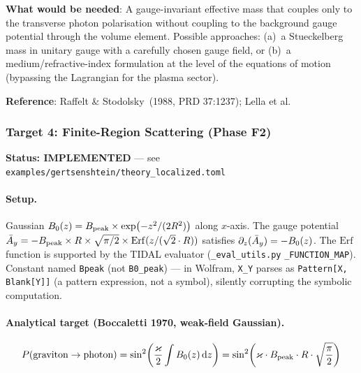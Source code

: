 \textbf{What would be needed}: A gauge-invariant effective mass that couples only to the transverse photon polarisation without coupling to the background gauge potential through the volume element. Possible approaches: (a)~a Stueckelberg mass in unitary gauge with a carefully chosen gauge field, or (b)~a medium/refractive-index formulation at the level of the equations of motion (bypassing the Lagrangian for the plasma sector).

\textbf{Reference}: Raffelt \& Stodolsky~(1988, PRD 37:1237); Lella et al.~\cite{lella2024constraining}

\subsubsection{Target 4: Finite-Region Scattering (Phase F2)}
\label{subsec:target4}

\textbf{Status: IMPLEMENTED} --- see \texttt{examples/gertsenshtein/theory\_localized.toml}

\paragraph{Setup.}
Gaussian $B_0(z) = B_\mathrm{peak} \times \exp(-z^2/(2R^2))$ along $x$-axis. The gauge potential $\bar{A}_y = -B_\mathrm{peak} \times R \times \sqrt{\pi/2} \times \mathrm{Erf}(z/(\sqrt{2}\cdot R))$ satisfies $\partial_z(\bar{A}_y) = -B_0(z)$. The $\mathrm{Erf}$ function is supported by the TIDAL evaluator (\texttt{\_eval\_utils.py} \texttt{\_FUNCTION\_MAP}). Constant named \texttt{Bpeak} (not \texttt{B0\_peak}) --- in Wolfram, \texttt{X\_Y} parses as \texttt{Pattern[X, Blank[Y]]} (a pattern expression, not a symbol), silently corrupting the symbolic computation.

\paragraph{Analytical target (Boccaletti 1970, weak-field Gaussian).}

\begin{equation}
  P(\text{graviton} \to \text{photon}) = \sin^2\!\left(\frac{\varkappa}{2} \int B_0(z)\,\mathrm{d}z\right) = \sin^2\!\left(\varkappa \cdot B_\mathrm{peak} \cdot R \cdot \sqrt{\frac{\pi}{2}}\right)
  \label{eq:gert-boccaletti}
\end{equation}


